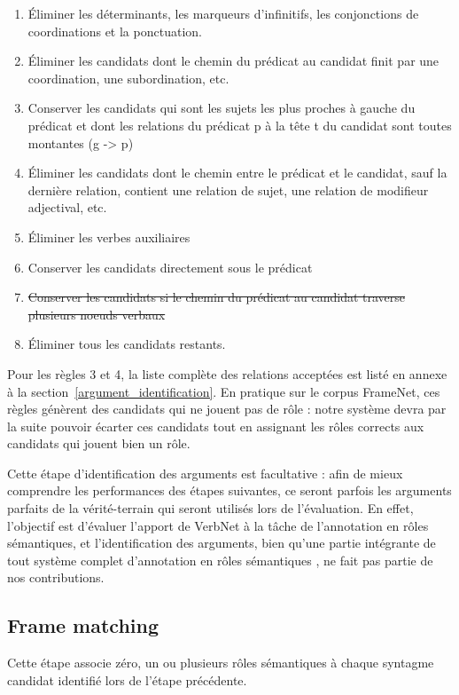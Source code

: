\begin{enumerate}
    \item Éliminer les déterminants, les marqueurs d'infinitifs, les conjonctions de coordinations et la ponctuation.
    \item Éliminer les candidats dont le chemin du prédicat au candidat finit par une coordination, une subordination, etc.
    \item Conserver les candidats qui sont les sujets les plus proches à gauche du prédicat et dont les relations du prédicat p à la tête t du candidat sont toutes montantes (g -> p)
    \item Éliminer les candidats  dont le chemin entre le prédicat et le candidat, sauf la dernière relation, contient une relation de sujet, une relation de modifieur adjectival, etc.
    \item Éliminer les verbes auxiliaires
    \item Conserver les candidats directement sous le prédicat
    \item \sout{Conserver les candidats si le chemin du prédicat au candidat traverse plusieurs noeuds verbaux}
    \item Éliminer tous les candidats restants.
\end{enumerate}

Pour les règles 3 et 4, la liste complète des relations acceptées est listé en
annexe à la section~\ref{argument_identification}. En pratique sur le corpus
FrameNet, ces règles génèrent des candidats qui ne jouent pas de rôle : notre
système devra par la suite pouvoir écarter ces candidats tout en assignant les
rôles corrects aux candidats qui jouent bien un rôle.

Cette étape d'identification des arguments est facultative : afin de mieux
comprendre les performances des étapes suivantes, ce seront parfois les
arguments parfaits de la vérité-terrain qui seront utilisés lors de
l'évaluation. En effet, l'objectif est d'évaluer l'apport de VerbNet à la tâche
de l'annotation en rôles sémantiques, et l'identification des arguments, bien
qu'une partie intégrante de tout système complet d'annotation en rôles
sémantiques \citep{das2010probabilistic}, ne fait pas partie de nos
contributions.

\subsection{Frame matching}

Cette étape associe zéro, un ou plusieurs rôles sémantiques à chaque syntagme
candidat identifié lors de l'étape précédente.

